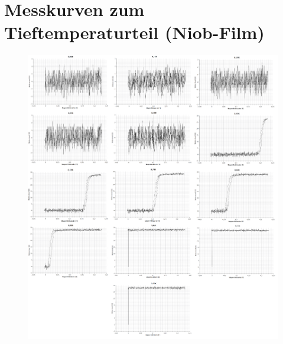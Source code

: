 \section{Messkurven zum Tieftemperaturteil (Niob-Film)}
\begin{figure}[H]
	\begin{center}
		\includegraphics[width=15cm]{graphen_niob}
	\end{center}
\end{figure}
